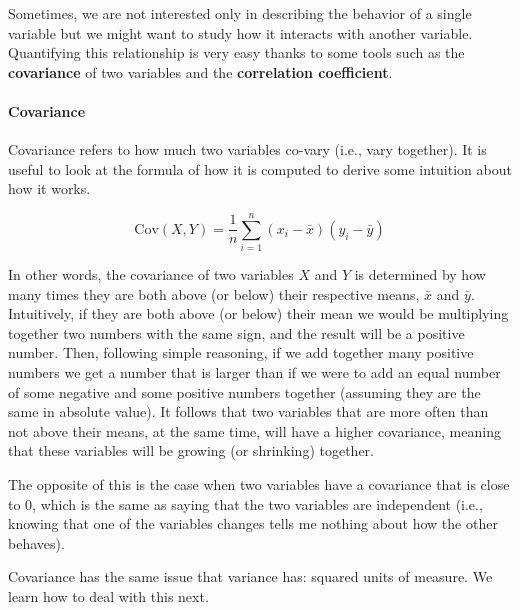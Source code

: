 \documentclass[
  letterpaper,
  DIV=11,
  numbers=noendperiod]{scrartcl}
\let\oldparagraph\paragraph
\renewcommand{\paragraph}[1]{\oldparagraph{#1}\mbox{}}
\begin{document}
Sometimes, we are not interested only in describing the behavior of a
single variable but we might want to study how it interacts with another
variable. Quantifying this relationship is very easy thanks to some
tools such as the \textbf{covariance} of two variables and the
\textbf{correlation coefficient}.

\paragraph{Covariance}\label{covariance}

Covariance refers to how much two variables co-vary (i.e., vary
together). It is useful to look at the formula of how it is computed to
derive some intuition about how it works.

\[
\text{Cov}(X, Y) = \frac{1}{n} \sum_{i=1}^{n} (x_i - \bar{x})(y_i - \bar{y})
\]

In other words, the covariance of two variables \(X\) and \(Y\) is
determined by how many times they are both above (or below) their
respective means, \(\bar{x}\) and \(\bar{y}\). Intuitively, if they are
both above (or below) their mean we would be multiplying together two
numbers with the same sign, and the result will be a positive number.
Then, following simple reasoning, if we add together many positive
numbers we get a number that is larger than if we were to add an equal
number of some negative and some positive numbers together (assuming
they are the same in absolute value). It follows that two variables that
are more often than not above their means, at the same time, will have a
higher covariance, meaning that these variables will be growing (or
shrinking) together.

The opposite of this is the case when two variables have a covariance
that is close to 0, which is the same as saying that the two variables
are independent (i.e., knowing that one of the variables changes tells
me nothing about how the other behaves).

\begin{tcolorbox}[enhanced jigsaw, bottomrule=.15mm, colframe=quarto-callout-caution-color-frame, arc=.35mm, leftrule=.75mm, toptitle=1mm, toprule=.15mm, titlerule=0mm, breakable, opacityback=0, colbacktitle=quarto-callout-caution-color!10!white, coltitle=black, bottomtitle=1mm, colback=white, title=\textcolor{quarto-callout-caution-color}{\faFire}\hspace{0.5em}{Caution}, left=2mm, rightrule=.15mm, opacitybacktitle=0.6]

Covariance has the same issue that variance has: squared units of
measure. We learn how to deal with this next.

\end{tcolorbox}
\end{document}
